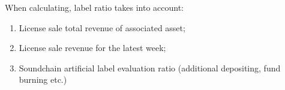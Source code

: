\documentclass[12pt]{report}
\begin{document}
When calculating, label ratio takes into account:
\begin{enumerate}
	\item License sale total revenue of associated asset;
	\item License sale revenue for the latest week;
	\item Soundchain artificial label evaluation ratio (additional depositing, fund burning etc.)
\end{enumerate}
\begin{equation}
\end{equation}


\end{document}
